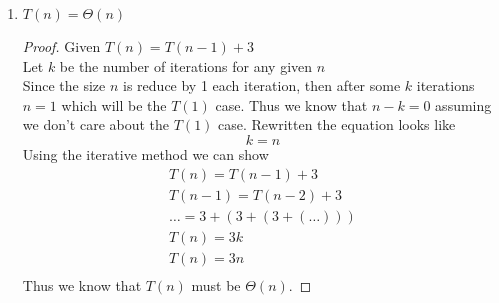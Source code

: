 \documentclass[paper=a4, fontsize=11pt]{scrartcl} %
\numberwithin{equation}{section} %
\numberwithin{figure}{section} %
\numberwithin{table}{section} %
\begin{document}
\begin{enumerate}
\begin{enumerate}
    \item $T(n) = \Theta(n)$
    \begin{proof}
        Given $T(n) = T(n - 1) + 3$ \\
        Let $k$ be the number of iterations for any given $n$ \\
        Since the size $n$ is reduce by 1 each iteration, then after some 
        $k$ iterations $n = 1$ which will be the $T(1)$ case. Thus we know
        that $n - k = 0$ assuming we don't care about the $T(1)$ case. 
        Rewritten the equation looks like 
        \begin{equation}
            k = n
        \end{equation}
        Using the iterative method we can show
        \begin{align*}
            T(n) = T(n - 1) + 3 \\
            T(n - 1) = T(n - 2) + 3 \\
            \ldots = 3 + (3 + (3 + (\ldots))) \\
            T(n) = 3k \\
            T(n) = 3n \tag{eq 0.3} \\
        \end{align*}
        Thus we know that $T(n)$ must be $\Theta(n)$.
    \end{proof}


\end{enumerate}
\end{enumerate}
\end{document}
